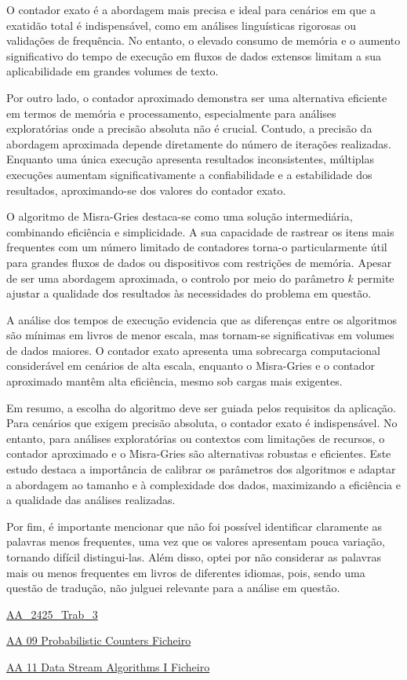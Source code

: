\documentclass[shortpaper, portugues, times, mirror]{revdetua}
\begin{document}
O contador exato é a abordagem mais precisa e ideal para cenários em que a exatidão total é indispensável, como em análises linguísticas rigorosas ou validações de frequência. No entanto, o elevado consumo de memória e o aumento significativo do tempo de execução em fluxos de dados extensos limitam a sua aplicabilidade em grandes volumes de texto.

Por outro lado, o contador aproximado demonstra ser uma alternativa eficiente em termos de memória e processamento, especialmente para análises exploratórias onde a precisão absoluta não é crucial. Contudo, a precisão da abordagem aproximada depende diretamente do número de iterações realizadas. Enquanto uma única execução apresenta resultados inconsistentes, múltiplas execuções aumentam significativamente a confiabilidade e a estabilidade dos resultados, aproximando-se dos valores do contador exato.

O algoritmo de Misra-Gries destaca-se como uma solução intermediária, combinando eficiência e simplicidade. A sua capacidade de rastrear os itens mais frequentes com um número limitado de contadores torna-o particularmente útil para grandes fluxos de dados ou dispositivos com restrições de memória. Apesar de ser uma abordagem aproximada, o controlo por meio do parâmetro \(k\) permite ajustar a qualidade dos resultados às necessidades do problema em questão.

A análise dos tempos de execução evidencia que as diferenças entre os algoritmos são mínimas em livros de menor escala, mas tornam-se significativas em volumes de dados maiores. O contador exato apresenta uma sobrecarga computacional considerável em cenários de alta escala, enquanto o Misra-Gries e o contador aproximado mantêm alta eficiência, mesmo sob cargas mais exigentes.

Em resumo, a escolha do algoritmo deve ser guiada pelos requisitos da aplicação. Para cenários que exigem precisão absoluta, o contador exato é indispensável. No entanto, para análises exploratórias ou contextos com limitações de recursos, o contador aproximado e o Misra-Gries são alternativas robustas e eficientes. Este estudo destaca a importância de calibrar os parâmetros dos algoritmos e adaptar a abordagem ao tamanho e à complexidade dos dados, maximizando a eficiência e a qualidade das análises realizadas.

Por fim, é importante mencionar que não foi possível identificar claramente as palavras menos frequentes, uma vez que os valores apresentam pouca variação, tornando difícil distingui-las. Além disso, optei por não considerar as palavras mais ou menos frequentes em livros de diferentes idiomas, pois, sendo uma questão de tradução, não julguei relevante para a análise em questão.

\begin{thebibliography}{2}

\bibitem{}
\url{AA_2425_Trab_3}

\bibitem{}
\url{AA 09 Probabilistic Counters Ficheiro}

\bibitem{}
\url{AA 11 Data Stream Algorithms I Ficheiro}
\end{thebibliography}
\end{document}

